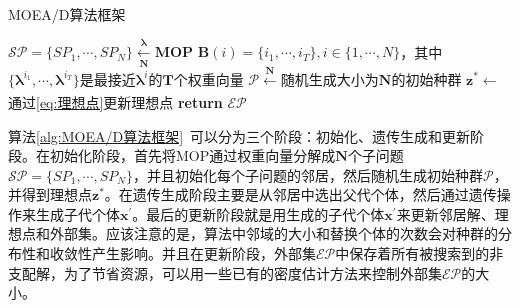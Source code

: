 \begin{algorithm}[ht]
    \caption{MOEA/D算法框架}
    \label{alg:MOEA/D算法框架}
    \BlankLine
    $\mathcal{SP} = \{ SP_1, \cdots, SP_N \} \xleftarrow[\mathbf{N}]{\boldsymbol{\lambda}} \mathbf{MOP}$ \;
    $\mathbf{B}(i) = \{ i_1, \cdots, i_T \}, i \in \{ 1, \cdots, N \}$，其中$\{ \boldsymbol{\lambda}^{i_1}, \cdots, \boldsymbol{\lambda}^{i_T} \}$是最接近$\boldsymbol{\lambda}^i$的$\mathbf{T}$个权重向量 \;
    $\mathcal{P} \xleftarrow[]{\mathbf{N}} $随机生成大小为$\mathbf{N}$的初始种群 \;
    $\mathbf{z}^* \leftarrow $通过\autoref{eq:理想点}更新理想点 \;
    \textbf{return } $\mathcal{EP}$ \;
\end{algorithm}
\par
算法\ref{alg:MOEA/D算法框架}~可以分为三个阶段：初始化、遗传生成和更新阶段。在初始化阶段，首先将MOP通过权重向量分解成$\mathbf{N}$个子问题$\mathcal{SP} = \{ SP_1, \cdots, SP_N \}$，并且初始化每个子问题的邻居，然后随机生成初始种群$\mathcal{P}$，并得到理想点$\mathbf{z}^*$。在遗传生成阶段主要是从邻居中选出父代个体，然后通过遗传操作来生成子代个体$\mathbf{x}^{'}$。最后的更新阶段就是用生成的子代个体$\mathbf{x}^{'}$来更新邻居解、理想点和外部集。应该注意的是，算法中邻域的大小和替换个体的次数会对种群的分布性和收敛性产生影响。并且在更新阶段，外部集$\mathcal{EP}$中保存着所有被搜索到的非支配解，为了节省资源，可以用一些已有的密度估计方法来控制外部集$\mathcal{EP}$的大小。

